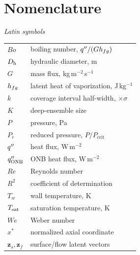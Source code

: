 \section*{Nomenclature}

\noindent
\begin{minipage}[t]{0.48\textwidth}
\textit{Latin symbols}\\[2pt]
\begin{tabular}{@{}l l@{}}
$Bo$        & boiling number, $q^{\prime\prime}/(Gh_{fg})$ \\
$D_{\mathrm{h}}$       & hydraulic diameter, m \\
$G$         & mass flux, kg\,m$^{-2}$\,s$^{-1}$ \\
$h_{fg}$      & latent heat of vaporization, J\,kg$^{-1}$ \\
$k$         & coverage interval half-width, $\times\sigma$ \\
$K$         & deep-ensemble size \\
$P$         & pressure, Pa \\
$P_r$       & reduced pressure, $P/P_{\mathrm{crit}}$ \\
$q^{\prime\prime}$      & heat flux, W\,m$^{-2}$ \\
$q''_{\mathrm{ONB}}$     & ONB heat flux, W\,m$^{-2}$ \\
$Re$        & Reynolds number \\
$R^2$       & coefficient of determination \\
$T_w$       & wall temperature, K \\
$T_{\mathrm{sat}}$     & saturation temperature, K \\
$We$        & Weber number \\
$x^{*}$     & normalized axial coordinate \\
$\mathbf{z}_s,\mathbf{z}_f$ & surface/flow latent vectors \\
\end{tabular}
\end{minipage}
\hfill
